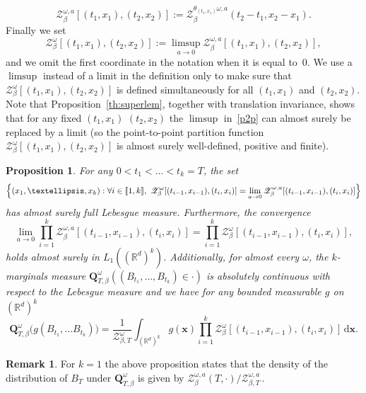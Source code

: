 \documentclass[11pt]{article}
\numberwithin{equation}{section}
\let\mathcal\mathscr
\let\sep:
\newcommand{\lint}{\mathopen{[\![}}
\newcommand{\rint}{\mathclose{]\!]}}
\newtheorem{proposition}[theorem]{Proposition}
\theoremstyle{definition}
\newtheorem{rem}[theorem]{Remark}
\newcommand{\bx}{\boldsymbol{x}}
\newcommand{\dd}{\mathrm{d}}
\newcommand{\cZ}{{\ensuremath{\mathcal Z}} }
\newcommand{\bQ}{{\ensuremath{\mathbf Q}} }
\newcommand{\bbR}{{\ensuremath{\mathbb R}} }
\let\gb\beta
\let\go\omega
\begin{document}
\begin{equation}
\cZ^{\go,a}_{\beta}[(t_1,x_1),(t_2,x_2)]:= \cZ^{\theta_{(t_1,x_1)}\go,a}_{\beta}(t_2-t_1, x_2-x_1).
\end{equation}
Finally we set
\begin{equation}
\label{p2p}
\cZ^{\go}_{\beta}[(t_1,x_1),(t_2,x_2)]:= \limsup_{a\to 0} \cZ^{\go,a}_{\beta}[(t_1,x_1),(t_2,x_2)],
\end{equation}
and we omit the first coordinate in the notation when it is equal to~$0$.
We use a $\limsup$ instead of a limit in the definition only to make sure that $\cZ^{\go}_{\beta}[(t_1,x_1),(t_2,x_2)]$ is defined simultaneously for all $(t_1,x_1)$ and $(t_2,x_2)$.
Note that Proposition~\ref{th:superlem}, togeth\-er with translation invariance, shows that
for any fixed $(t_1,x_1)$ $(t_2,x_2)$
the $\limsup$ in~\eqref{p2p} can almost surely be replaced by a limit (so the point-to-point partition function
$\cZ_{\gb}^{\go}[(t_1,x_1),(t_2,x_2)]$
is almost surely well-defined, positive and finite).

\begin{proposition}
\label{twomarg}
For any $0<t_1<\dots<t_k=T$,
the set
\[
\Bigl\{ (x_1, \ldots, x_k) \sep \forall i\in \lint 1,k\rint,\ \cZ^{\go}_{\beta}[(t_{i-1},x_{i-1}),(t_i,x_{i})] = \lim_{a\to 0} \cZ^{\go,a}_{\beta}[(t_{i-1},x_{i-1}),(t_i,x_{i})] \Bigr\}
\]
has almost surely full Lebesgue measure.
Furthermore, the convergence
\begin{equation}
\lim_{a\to 0}\prod_{i=1}^k \cZ^{\go,a}_{\beta}[(t_{i-1},x_{i-1}),(t_i,x_{i})]=\prod_{i=1}^k \cZ^{\go}_{\beta}[(t_{i-1},x_{i-1}),(t_i,x_{i})],
\end{equation}
holds almost surely in $L_1((\bbR^{d})^{k})$.
Additionally, for almost every $\go$, the $k$-marginals measure $\bQ^{\go}_{T,\beta}((B_{t_1},\dots, B_{t_k})\in \cdot)$ is absolutely continuous with respect to the Lebesgue measure
and we have for any bounded measurable $g$ on $(\bbR^{d})^{k}$
\begin{equation}
\bQ^{\go}_{T,\beta} \bigl(g(B_{t_1},\dots B_{t_k}) \bigr)= \frac{1 }{\mathcal Z^{\go}_{\beta,T}} \int_{(\bbR^d)^k} g(\bx)\prod_{i=1}^k \cZ^{\go}_{\beta}[(t_{i-1},x_{i-1}),(t_i,x_{i})] \,\dd \bx.
\end{equation}
\end{proposition}

\begin{rem}
For $k=1$ the above proposition states that the density of the distribution of $B_T$ under $\bQ_{T,\gb}^{\go}$ is given by $\cZ^{\go,a}_{\beta}(T,\cdot)/\cZ^{\go,a}_{\beta,T}\,$.
\end{rem}
\end{document}
